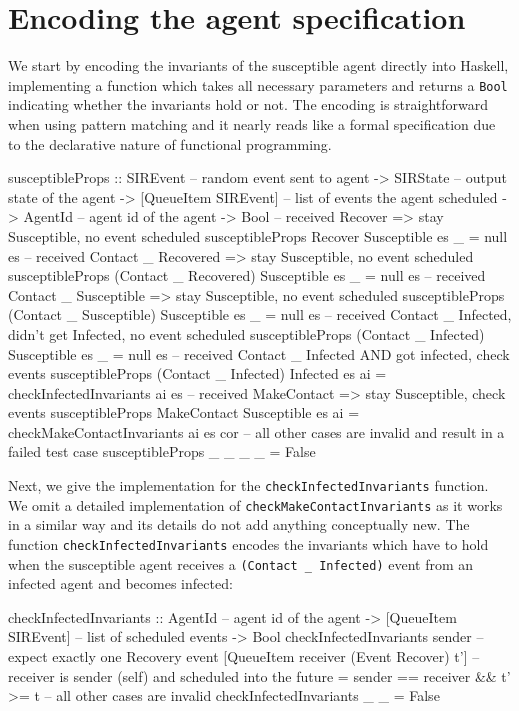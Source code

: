 \section{Encoding the agent specification}
\label{sec:method}
We start by encoding the invariants of the susceptible agent directly into Haskell, implementing a function which takes all necessary parameters and returns a \texttt{Bool} indicating whether the invariants hold or not. The encoding is straightforward when using pattern matching and it nearly reads like a formal specification due to the declarative nature of functional programming.

\begin{HaskellCode}
susceptibleProps :: SIREvent              -- random event sent to agent
                 -> SIRState              -- output state of the agent
                 -> [QueueItem SIREvent]  -- list of events the agent scheduled
                 -> AgentId               -- agent id of the agent
                 -> Bool
-- received Recover => stay Susceptible, no event scheduled
susceptibleProps Recover Susceptible es _ = null es
-- received Contact _ Recovered => stay Susceptible, no event scheduled
susceptibleProps (Contact _ Recovered) Susceptible es _ = null es
-- received Contact _ Susceptible => stay Susceptible, no event scheduled
susceptibleProps (Contact _ Susceptible) Susceptible es _  = null es
-- received Contact _ Infected, didn't get Infected, no event scheduled
susceptibleProps (Contact _ Infected) Susceptible es _ = null es
-- received Contact _ Infected AND got infected, check events
susceptibleProps (Contact _ Infected) Infected es ai
  = checkInfectedInvariants ai es
-- received MakeContact => stay Susceptible, check events
susceptibleProps MakeContact Susceptible es ai
  = checkMakeContactInvariants ai es cor
-- all other cases are invalid and result in a failed test case
susceptibleProps _ _ _ _ = False
\end{HaskellCode}

Next, we give the implementation for the \texttt{checkInfectedInvariants} function. We omit a detailed implementation of \texttt{checkMakeContactInvariants} as it works in a similar way and its details do not add anything conceptually new. The function \texttt{checkInfectedInvariants} encodes the invariants which have to hold when the susceptible agent receives a \texttt{(Contact \_ Infected)} event from an infected agent and becomes infected:

\begin{HaskellCode}
checkInfectedInvariants :: AgentId               -- agent id of the agent 
                        -> [QueueItem SIREvent]  -- list of scheduled events
                        -> Bool
checkInfectedInvariants sender 
  -- expect exactly one Recovery event
  [QueueItem receiver (Event Recover) t'] 
  -- receiver is sender (self) and scheduled into the future
  = sender == receiver && t' >= t 
-- all other cases are invalid
checkInfectedInvariants _ _ = False
\end{HaskellCode}

